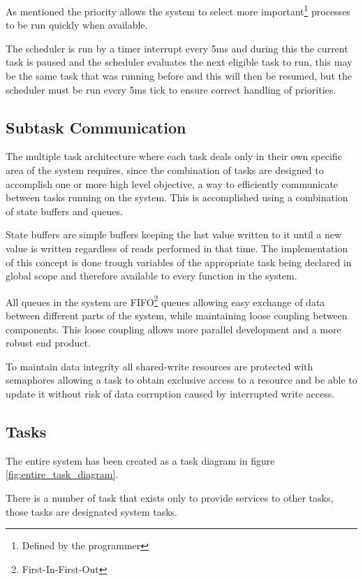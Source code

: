 \documentclass[../../../main]{subfiles}
\begin{document}
As mentioned the priority allows the system to select more important\footnote{Defined by the programmer} processes to be run quickly when available.  

The scheduler is run by a timer interrupt every 5ms and during this the current task is paused and the scheduler evaluates the next eligible task to run, this may be the same task that was running before and this will then be resumed, but the scheduler must be run every 5ms tick to ensure correct handling of priorities.

\subsection{Subtask Communication}

The multiple task architecture where each task deals only in their own specific area of the system requires, since the combination of tasks are designed to accomplish one or more high level objective, a way to efficiently communicate between tasks running on the system. 
This is accomplished using a combination of state buffers and queues. 

State buffers are simple buffers keeping the last value written to it until a new value is written regardless of reads performed in that time. The implementation of this concept is done trough variables of the appropriate task being declared in global scope and therefore available to every function in the system.

All queues in the system are FIFO\footnote{First-In-First-Out} queues allowing easy exchange of data between different parts of the system, while maintaining loose coupling between components. This loose coupling allows more parallel development and a more robust end product. 

To maintain data integrity all shared-write resources are protected with semaphores allowing a task to obtain exclusive access to a resource and be able to update it without risk of data corruption caused by interrupted write access.




\subsection{Tasks}

The entire system has been created as a task diagram in figure \ref{fig:entire_task_diagram}. 

There is a number of task that exists only to provide services to other tasks, those tasks are designated system tasks. 
\end{document}
